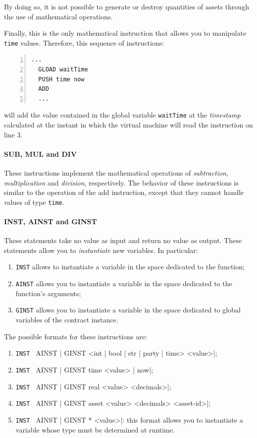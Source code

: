 By doing so, it is not possible to generate or destroy quantities of assets through the use of 
mathematical operations.

Finally, this is the only mathematical instruction that allows you to manipulate \verb|time| values. 
Therefore, this sequence of instructions:
\begin{Verbatim}[numbers=left,xleftmargin=1cm,firstnumber=1,tabsize=2]
  ...
  GLOAD waitTime
  PUSH time now
  ADD
  ...
\end{Verbatim}

will add the value contained in the global variable \verb|waitTime| at the \textit{timestamp} calculated 
at the instant in which the virtual machine will read the instruction on line 3.

\paragraph{SUB, MUL and DIV}

These instructions implement the mathematical operations of \textit{subtraction}, \textit{multiplication} 
and \textit{division}, respectively. The behavior of these instructions is similar to the operation of the 
add instruction, except that they cannot handle values of type \verb|time|.

\paragraph{INST, AINST and GINST}

These statements take no value as input and return no value as output. These statements allow you to 
\textit{instantiate} new variables. In particular:
\begin{enumerate}
  \item \verb|INST| allows to instantiate a variable in the space dedicated to the function;
  \item \verb|AINST| allows you to instantiate a variable in the space dedicated to the function's 
  arguments;
  \item \verb|GINST| allows you to instantiate a variable in the space dedicated to global variables of 
  the contract instance.
\end{enumerate}

The possible formats for these instructions are:
\begin{enumerate}
  \item \verb|INST | AINST | GINST <int | bool | str | party | time> <value>|;
  \item \verb|INST | AINST | GINST time <value> | now|;
  \item \verb|INST | AINST | GINST real <value> <decimals>|;
  \item \verb|INST | AINST | GINST asset <value> <decimals> <asset-id>|;
  \item \verb|INST | AINST | GINST * <value>|: this format allows you to instantiate a variable whose 
  type must be determined at runtime.
\end{enumerate} 


